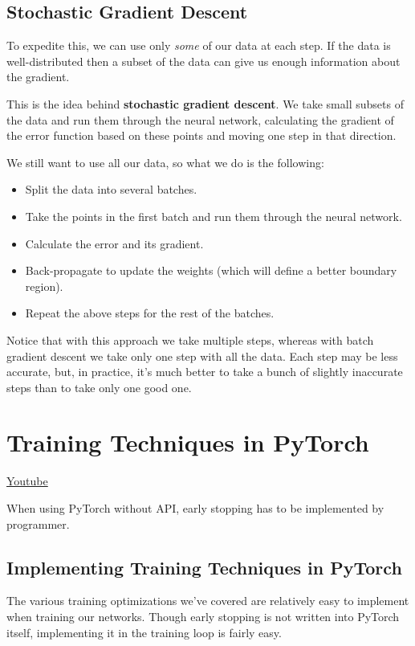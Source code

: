 \subsection{Stochastic Gradient Descent}

To expedite this, we can use only \textit{some} of our data at each step. If the data is well-distributed then a subset of the data can give us enough information about the gradient.

This is the idea behind \textbf{stochastic gradient descent}. We take small subsets of the data and run them through the neural network, calculating the gradient of the error function based on these points and moving one step in that direction.

We still want to use all our data, so what we do is the following:

\begin{itemize}
    \item Split the data into several batches.
    \item Take the points in the first batch and run them through the neural network.
    \item Calculate the error and its gradient.
    \item Back-propagate to update the weights (which will define a better boundary region).
    \item Repeat the above steps for the rest of the batches.
\end{itemize}
Notice that with this approach we take multiple steps, whereas with batch gradient descent we take only one step with all the data. Each step may be less accurate, but, in practice, it's much better to take a bunch of slightly inaccurate steps than to take only one good one.


\section{Training Techniques in PyTorch}
\href{https://www.youtube.com/watch?v=dmeeuBWa1us&t=1s&ab_channel=Udacity}{Youtube} \newline

When using PyTorch without API, early stopping has to be implemented by programmer. 

\subsection{Implementing Training Techniques in PyTorch}

The various training optimizations we've covered are relatively easy to implement when training our networks. Though early stopping is not written into PyTorch itself, implementing it in the training loop is fairly easy.


